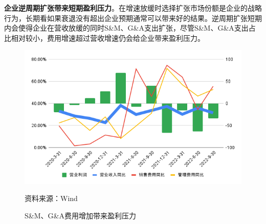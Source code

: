 \textbf{企业逆周期扩张带来短期盈利压力}。在增速放缓时选择扩张市场份额是企业的战略行为，长期看如果衰退没有超出企业预期通常可以带来好的结果。逆周期扩张短期内会使得企业在营收放缓的同时S\&M、G\&A支出扩张，尽管S\&M、G\&A支出占比相对较小，费用增速超过营收增速仍会给企业带来盈利压力。
\begin{figure}[H]
    \caption{S\&M、G\&A费用增加带来盈利压力}
    \begin{center}
        \includegraphics[width=0.8\linewidth]{img/rates.png}
    \end{center}
    \footnotesize{资料来源：Wind}
\end{figure}

